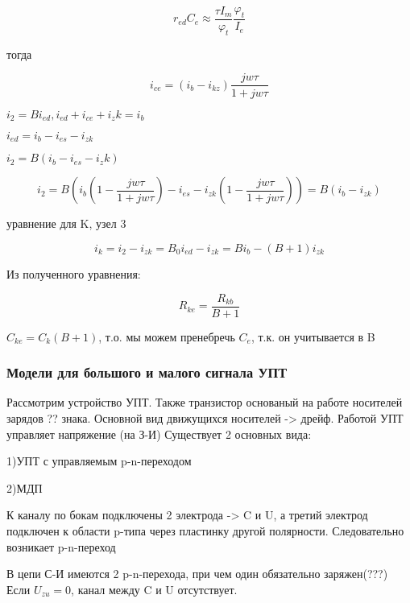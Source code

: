 $$r_{ed} C_e \approx\frac{\tau I_m}{\varphi_t }\frac{\varphi_t }{ I_e }
$$

тогда 

$$
i_{ce}=(i_b - i_{kz}) \frac{jw\tau}{1+ jw\tau}
$$

$i_2=Bi_{ed}, i_{ed}+i_{ce}+i_zk=i_b$

$i_{ed}= i_b-i_{es}-i_{zk}$

$i_2=B(i_b-i_{es}-i_zk)$

$$
i_2=B(i_b(1- \frac{jw\tau}{1+ jw\tau })-i_{es}-i_{zk}(1- \frac{jw\tau}{1+ jw\tau }))=B(i_b-i_{zk})
$$

уравнение для K, узел 3

$$
i_k=i_2-i_{zk}=B_0 i_{ed} - i_{zk}=Bi_b - (B+1)i_{zk}
$$

Из полученного уравнения:

$$
R_{ke} = \frac{ R_{kb} }{B+1}
$$

$C_{ke} = C_k(B+1)$, т.о. мы можем пренебречь $C_e$, т.к. он учитывается в B
\begin{center}
\begin{figure}[h!]
		\label{}
	\end{figure}
\end{center}


\subsubsection{Модели для большого и малого сигнала УПТ}

Рассмотрим устройство УПТ. Также транзистор основаный на работе носителей зарядов ?? знака. Основной вид движущихся носителей -> дрейф. Работой УПТ управляет напряжение (на З-И)
Существует 2 основных вида:

1)УПТ с управляемым p-n-переходом

2)МДП 

К каналу по бокам подключены 2 электрода -> C  и U, а третий электрод подключен к области p-типа через пластинку  другой полярности. Следовательно возникает p-n-переход
\begin{center}
\begin{figure}[h!]
		\label{}
	\end{figure}
\end{center}

\begin{center}
\begin{figure}[h!]
		\label{}
	\end{figure}
\end{center}
В цепи С-И имеются 2 p-n-перехода, при чем один обязательно заряжен(???) Если $U_{zu}=0$, канал между C и  U отсутствует.

